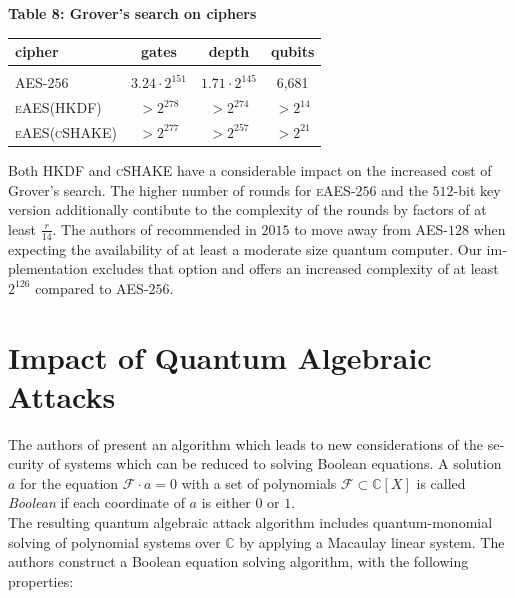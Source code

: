 \documentclass[a4paper,11pt]{article}
\begin{document}
\begin{otherlanguage}{english}
\begin{center}
\textbf{Table 8: Grover's search on ciphers} \\
\vspace{0.2cm}
  \begin{tabular}{l|c|c|c}
  cipher &  gates & depth & qubits \\ 
  \hline
    &  &  & \\ [-8pt]
  \textsc{AES}-$256$ & $3.24 \cdot 2^{151}$  & $1.71 \cdot 2^{145}$  & 6,681 \\
  \small{\textsc{eAES}(\tiny{\textsc{HKDF}})} & $> 2^{278}$ & $ > 2^{274}$ & $>  2^{14}$  \\  
  \small{\textsc{eAES}(\tiny{\textsc{cSHAKE}})} & $> 2^{277}$ & $ > 2^{257}$ & $> 2^{21}$  \\  
  \end{tabular} 
\end{center}
\vspace{0.5cm} 

\noindent
Both \textsc{HKDF} and \textsc{cSHAKE} have a considerable impact on the increased cost of Grover's search. The higher number of rounds for \textsc{eAES}-$256$ and the $512$-bit key version additionally contibute to the complexity of the rounds by factors of at least $\frac{r}{14}$. The authors of \cite{GRO} recommended in $2015$ to move away from \textsc{AES}-$128$ when expecting the availability of at least a moderate size quantum computer. Our implementation excludes that option and offers an increased complexity of at least $2^{126}$ compared to \textsc{AES}-$256$. \\

\section{Impact of Quantum Algebraic Attacks}

\noindent
The authors of \cite{QAA} present an algorithm which leads to new considerations of the security of systems which can be reduced to solving Boolean equations. A solution $a$ for the equation $\mathcal{F} \cdot a = 0$ with a set of polynomials $\mathcal{F} \subset \mathbb{C}[X]$ is called \textit{Boolean} if each coordinate of $a$ is either $0$ or $1$.\\

\noindent
The resulting quantum algebraic attack algorithm includes quantum-monomial solving of polynomial systems over $\mathbb{C}$ by applying a Macaulay linear system. The authors construct a Boolean equation solving algorithm, with the following properties: \\


\end{otherlanguage}
\end{document}
